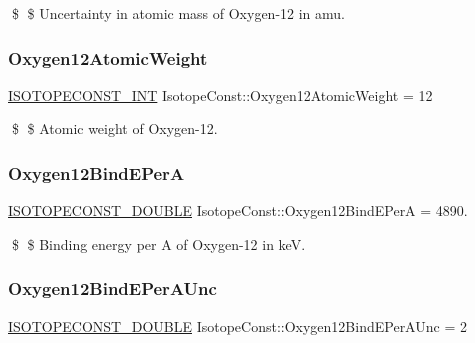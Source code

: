 \$ \$ Uncertainty in atomic mass of Oxygen-\/12 in amu. \mbox{\label{group___isotope_const-_oxygen-_o12_ga20ce61352af5ca806c57f3c671ef5908}} 
\subsubsection{\texorpdfstring{Oxygen12\+Atomic\+Weight}{Oxygen12AtomicWeight}}
{\footnotesize\ttfamily \mbox{\hyperlink{group___isotope_const-_macros_ga5f18360b3e99483a35c32d789e62621c}{I\+S\+O\+T\+O\+P\+E\+C\+O\+N\+S\+T\+\_\+\+I\+NT}} Isotope\+Const\+::\+Oxygen12\+Atomic\+Weight = 12}

\$ \$ Atomic weight of Oxygen-\/12. \mbox{\label{group___isotope_const-_oxygen-_o12_ga1c01452fffc3f96c61d0624be1b5b833}} 
\subsubsection{\texorpdfstring{Oxygen12\+Bind\+E\+PerA}{Oxygen12BindEPerA}}
{\footnotesize\ttfamily \mbox{\hyperlink{group___isotope_const-_macros_ga8f45a7272ce02c0b4c65c44636ed719a}{I\+S\+O\+T\+O\+P\+E\+C\+O\+N\+S\+T\+\_\+\+D\+O\+U\+B\+LE}} Isotope\+Const\+::\+Oxygen12\+Bind\+E\+PerA = 4890.}

\$ \$ Binding energy per A of Oxygen-\/12 in keV. \mbox{\label{group___isotope_const-_oxygen-_o12_ga000f30d09152296c8fd6e27354aacb29}} 
\subsubsection{\texorpdfstring{Oxygen12\+Bind\+E\+Per\+A\+Unc}{Oxygen12BindEPerAUnc}}
{\footnotesize\ttfamily \mbox{\hyperlink{group___isotope_const-_macros_ga8f45a7272ce02c0b4c65c44636ed719a}{I\+S\+O\+T\+O\+P\+E\+C\+O\+N\+S\+T\+\_\+\+D\+O\+U\+B\+LE}} Isotope\+Const\+::\+Oxygen12\+Bind\+E\+Per\+A\+Unc = 2}

